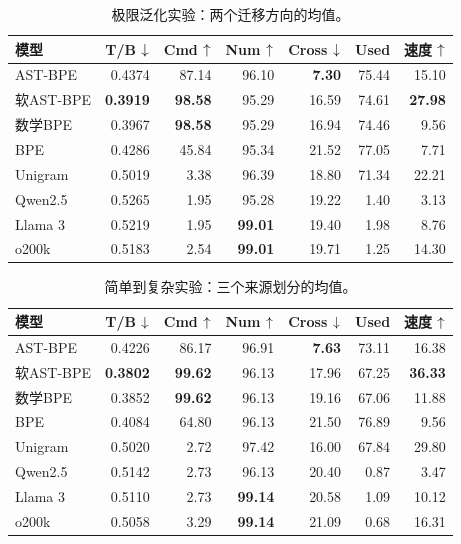 \begin{table}[H]
\centering\fontsize{8}{9.4}\selectfont\setlength{\tabcolsep}{2.0pt}\renewcommand{\arraystretch}{1.06}
\caption{极限泛化实验：两个迁移方向的均值。}\label{tab:extreme}
\begin{tabular}{lrrrrrr}\toprule
模型&T/B $\downarrow$&Cmd $\uparrow$&Num $\uparrow$&Cross $\downarrow$&Used&速度 $\uparrow$\\\midrule
AST-BPE & 0.4374 & 87.14 & 96.10 & \textbf{7.30} & 75.44 & 15.10 \\
软AST-BPE & \textbf{0.3919} & \textbf{98.58} & 95.29 & 16.59 & 74.61 & \textbf{27.98} \\
数学BPE & 0.3967 & \textbf{98.58} & 95.29 & 16.94 & 74.46 & 9.56 \\
BPE & 0.4286 & 45.84 & 95.34 & 21.52 & 77.05 & 7.71 \\
Unigram & 0.5019 & 3.38 & 96.39 & 18.80 & 71.34 & 22.21 \\
\midrule
Qwen2.5 & 0.5265 & 1.95 & 95.28 & 19.22 & 1.40 & 3.13 \\
Llama 3 & 0.5219 & 1.95 & \textbf{99.01} & 19.40 & 1.98 & 8.76 \\
o200k & 0.5183 & 2.54 & \textbf{99.01} & 19.71 & 1.25 & 14.30 \\
\bottomrule\end{tabular}
\end{table}

\begin{table}[H]
\centering\fontsize{8}{9.4}\selectfont\setlength{\tabcolsep}{2.0pt}\renewcommand{\arraystretch}{1.06}
\caption{简单到复杂实验：三个来源划分的均值。}\label{tab:complexity}
\begin{tabular}{lrrrrrr}\toprule
模型&T/B $\downarrow$&Cmd $\uparrow$&Num $\uparrow$&Cross $\downarrow$&Used&速度 $\uparrow$\\\midrule
AST-BPE & 0.4226 & 86.17 & 96.91 & \textbf{7.63} & 73.11 & 16.38 \\
软AST-BPE & \textbf{0.3802} & \textbf{99.62} & 96.13 & 17.96 & 67.25 & \textbf{36.33} \\
数学BPE & 0.3852 & \textbf{99.62} & 96.13 & 19.16 & 67.06 & 11.88 \\
BPE & 0.4084 & 64.80 & 96.13 & 21.50 & 76.89 & 9.56 \\
Unigram & 0.5020 & 2.72 & 97.42 & 16.00 & 67.84 & 29.80 \\
\midrule
Qwen2.5 & 0.5142 & 2.73 & 96.13 & 20.40 & 0.87 & 3.47 \\
Llama 3 & 0.5110 & 2.73 & \textbf{99.14} & 20.58 & 1.09 & 10.12 \\
o200k & 0.5058 & 3.29 & \textbf{99.14} & 21.09 & 0.68 & 16.31 \\
\bottomrule\end{tabular}
\end{table}
